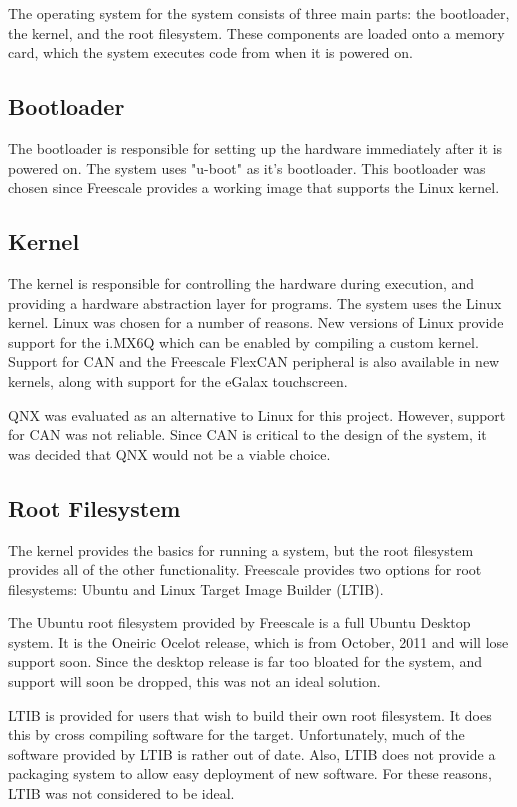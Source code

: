 \documentclass[ece]{uw-wkrpt}
\begin{document}
The operating system for the system consists of three main parts: the
bootloader, the kernel, and the root filesystem. These components are loaded
onto a memory card, which the system executes code from when it is powered on.

\subsection{Bootloader}

The bootloader is responsible for setting up the hardware immediately after it
is powered on. The system uses "u-boot" as it's bootloader. This bootloader was
chosen since Freescale provides a working image that supports the Linux kernel.

\subsection{Kernel}

The kernel is responsible for controlling the hardware during execution, and
providing a hardware abstraction layer for programs. The system uses the Linux
kernel. Linux was chosen for a number of reasons. New versions of Linux provide
support for the i.MX6Q which can be enabled by compiling a custom kernel.
Support for CAN and the Freescale FlexCAN peripheral is also available in new
kernels, along with support for the eGalax touchscreen.

QNX was evaluated as an alternative to Linux for this project. However, support
for CAN was not reliable. Since CAN is critical to the design of the system, it
was decided that QNX would not be a viable choice.

\subsection{Root Filesystem}

The kernel provides the basics for running a system, but the root filesystem
provides all of the other functionality. Freescale provides two options for root
filesystems: Ubuntu and Linux Target Image Builder (LTIB).

The Ubuntu root filesystem provided by Freescale is a full Ubuntu Desktop
system. It is the Oneiric Ocelot release, which is from October, 2011 and will
lose support soon. Since the desktop release is far too bloated for the system,
and support will soon be dropped, this was not an ideal solution.

LTIB is provided for users that wish to build their own root filesystem. It does
this by cross compiling software for the target. Unfortunately, much of the
software provided by LTIB is rather out of date. Also, LTIB does not provide a
packaging system to allow easy deployment of new software. For these reasons,
LTIB was not considered to be ideal.
\end{document}
